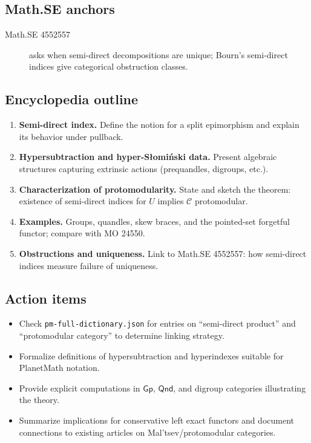 \subsection*{Math.SE anchors}
\begin{description}
  \item[Math.SE 4552557] asks when semi-direct decompositions are unique; Bourn’s semi-direct indices give categorical obstruction classes.
\end{description}
\subsection*{Encyclopedia outline}
\begin{enumerate}
  \item \textbf{Semi-direct index.} Define the notion for a split epimorphism and explain its behavior under pullback.
  \item \textbf{Hypersubtraction and hyper-S{\l}omi\'nski data.} Present algebraic structures capturing extrinsic actions (prequandles, digroups, etc.).
  \item \textbf{Characterization of protomodularity.} State and sketch the theorem: existence of semi-direct indices for $U$ implies $\mathcal{C}$ protomodular.
  \item \textbf{Examples.} Groups, quandles, skew braces, and the pointed-set forgetful functor; compare with MO 24550.
  \item \textbf{Obstructions and uniqueness.} Link to Math.SE 4552557: how semi-direct indices measure failure of uniqueness.
\end{enumerate}
\subsection*{Action items}
\begin{itemize}
  \item Check \texttt{pm-full-dictionary.json} for entries on ``semi-direct product'' and ``protomodular category'' to determine linking strategy.
  \item Formalize definitions of hypersubtraction and hyperindexes suitable for PlanetMath notation.
  \item Provide explicit computations in $\mathsf{Gp}$, $\mathsf{Qnd}$, and digroup categories illustrating the theory.
  \item Summarize implications for conservative left exact functors and document connections to existing articles on Mal'tsev/protomodular categories.
\end{itemize}
